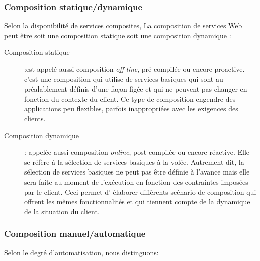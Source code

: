     \subsubsection{Composition statique/dynamique}
    \label{sec:comp-stat}
    Selon la disponibilité de services composites, La composition de
    services Web peut être soit une composition statique soit une
    composition dynamique \cite{driss2011approche}:\bigskip

    \renewcommand{\descriptionlabel}[1]{\hspace{0.5cm}\textbullet~\textsf{#1}}
    \begin{description}
    \item[Composition statique] :est appelé aussi composition
      \textit{off-line}, pré-compilée ou encore proactive. c'est une
      composition qui utilise de services basiques qui sont au
      préalablement définis d'une façon figée et qui ne peuvent pas
      changer en fonction du contexte du client. Ce type de
      composition engendre des applications peu flexibles, parfois
      inappropriées avec les exigences des clients.

    \item[Composition dynamique]: appelée aussi composition
      \textit{online}, post-compilée ou encore réactive. Elle se réfère
      à la sélection de services basiques à la volée. Autrement dit,
      la sélection de services basiques ne peut pas être définie à
      l'avance mais elle sera faite au moment de l'exécution en
      fonction des contraintes imposées par le client. Ceci permet d'
      élaborer différents scénario de composition qui offrent les
      mêmes fonctionnalités et qui tiennent compte de la dynamique de
      la situation du client.
    \end{description}
    \enddescription

    \subsubsection{Composition manuel/automatique}
    \label{sec:comp-manu}
    Selon le degré d'automatisation, nous distinguons:

